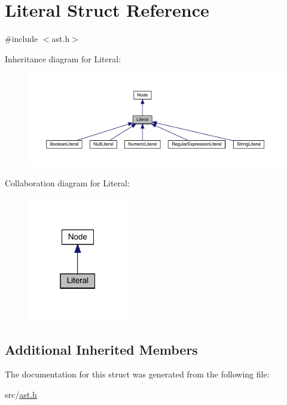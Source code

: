 \hypertarget{struct_literal}{}\section{Literal Struct Reference}
\label{struct_literal}


{\ttfamily \#include $<$ast.\+h$>$}



Inheritance diagram for Literal\+:\nopagebreak
\begin{figure}[H]
\begin{center}
\leavevmode
\includegraphics[width=350pt]{struct_literal__inherit__graph}
\end{center}
\end{figure}


Collaboration diagram for Literal\+:\nopagebreak
\begin{figure}[H]
\begin{center}
\leavevmode
\includegraphics[width=123pt]{struct_literal__coll__graph}
\end{center}
\end{figure}
\subsection*{Additional Inherited Members}


The documentation for this struct was generated from the following file\+:\begin{DoxyCompactItemize}
\item 
src/\hyperlink{ast_8h}{ast.\+h}\end{DoxyCompactItemize}
